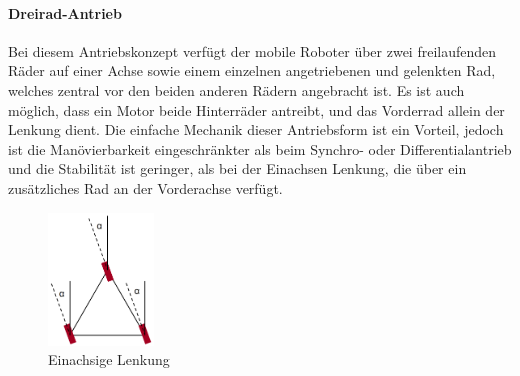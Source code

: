 \paragraph{Dreirad-Antrieb}
Bei diesem Antriebskonzept verfügt der mobile Roboter über zwei freilaufenden Räder auf einer Achse sowie einem einzelnen angetriebenen und gelenkten Rad, welches zentral vor den beiden anderen Rädern angebracht ist. Es ist auch möglich, dass ein Motor beide Hinterräder antreibt, und das Vorderrad allein der Lenkung dient.
\newline
Die einfache Mechanik dieser Antriebsform ist ein Vorteil, jedoch ist die Manövierbarkeit eingeschränkter als beim Synchro- oder Differentialantrieb und die Stabilität ist geringer, als bei der Einachsen Lenkung, die über ein zusätzliches Rad an der Vorderachse verfügt.
\begin{figure}
	\vspace{-0.8cm}
	\begin{center}
		\includegraphics[width=0.25\textwidth]{images/technische_grundlagen/Synchroantrieb.png}
	\end{center}
	\caption{Einachsige Lenkung}
	\label{fig:einachsenlenkung}
\end{figure}
